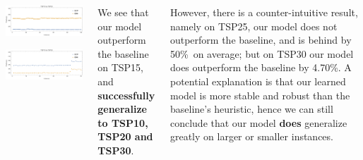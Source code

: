 \documentclass[20pt,,margin=1in,innermargin=-4.5in,blockverticalspace=-0.25in]{tikzposter}
\begin{document}
\begin{columns}
{\begin{center}
\begin{minipage}{0.49\linewidth}
\begin{tikzfigure}
				\end{tikzfigure}%
			\end{minipage}\hfill
			\begin{minipage}{0.49\linewidth}
				\centering
				\begin{tikzfigure}
					\includegraphics[width=13cm]{Figures/result/15-25.png}
				\end{tikzfigure}%
			\end{minipage}
			\includegraphics[width=27cm]{Figures/result/15-30(from15-15).png}
		\end{center}
		We see that our model outperform the baseline on TSP15, and \textbf{successfully generalize to TSP10, TSP20
			and TSP30}.

		However, there is a counter-intuitive result, namely on TSP25, our model does not
		outperform the baseline, and is behind by 50\%\ on average; but on TSP30 our model does outperform the baseline
		by 4.70\%. A potential explanation is that our learned model is more stable and robust than the
		baseline's heuristic, hence we can still conclude that our model \textbf{does} generalize greatly on larger
		or smaller instances.
	}

\end{columns}
\end{document}
